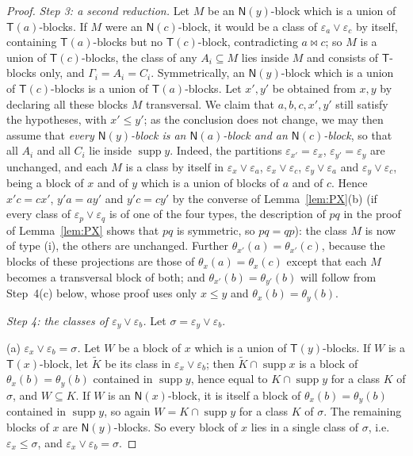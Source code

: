 \documentclass[11pt]{amsart}
\theoremstyle{definition}
\newcommand{\supp}{\operatorname{supp}}
\newcommand{\T}{\mathsf{T}}
\newcommand{\N}{\mathsf{N}}
\newcommand{\mt}{\bowtie}      %
\begin{document}
\begin{proof}
\emph{Step 3: a second reduction.} Let $M$ be an $\N(y)$-block which is a union of $\T(a)$-blocks. If $M$ were an $\N(c)$-block, it would be a class of $\varepsilon_a\vee\varepsilon_c$ by itself, containing $\T(a)$-blocks but no $\T(c)$-block, contradicting $a\mt c$; so $M$ is a union of $\T(c)$-blocks, the class of any $A_i\subseteq M$ lies inside $M$ and consists of $\T$-blocks only, and $\Gamma_i=A_i=C_i$. Symmetrically, an $\N(y)$-block which is a union of $\T(c)$-blocks is a union of $\T(a)$-blocks. Let $x',y'$ be obtained from $x,y$ by declaring all these blocks $M$ transversal. We claim that $a,b,c,x',y'$ still satisfy the hypotheses, with $x'\le y'$; as the conclusion does not change, we may then assume that \emph{every $\N(y)$-block is an $\N(a)$-block and an $\N(c)$-block}, so that all $A_i$ and all $C_i$ lie inside $\supp y$. Indeed, the partitions $\varepsilon_{x'}=\varepsilon_x$, $\varepsilon_{y'}=\varepsilon_y$ are unchanged, and each $M$ is a class by itself in $\varepsilon_x\vee\varepsilon_a$, $\varepsilon_x\vee\varepsilon_c$, $\varepsilon_y\vee\varepsilon_a$ and $\varepsilon_y\vee\varepsilon_c$, being a block of $x$ and of $y$ which is a union of blocks of $a$ and of $c$. Hence $x'c=cx'$, $y'a=ay'$ and $y'c=cy'$ by the converse of Lemma~\ref{lem:PX}(b) (if every class of $\varepsilon_p\vee\varepsilon_q$ is of one of the four types, the description of $pq$ in the proof of Lemma~\ref{lem:PX} shows that $pq$ is symmetric, so $pq=qp$): the class $M$ is now of type (i), the others are unchanged. Further $\theta_{x'}(a)=\theta_{x'}(c)$, because the blocks of these projections are those of $\theta_x(a)=\theta_x(c)$ except that each $M$ becomes a transversal block of both; and $\theta_{x'}(b)=\theta_{y'}(b)$ will follow from Step~4(c) below, whose proof uses only $x\le y$ and $\theta_x(b)=\theta_y(b)$.

\emph{Step 4: the classes of $\varepsilon_y\vee\varepsilon_b$.} Let $\sigma=\varepsilon_y\vee\varepsilon_b$.

(a) \emph{$\varepsilon_x\vee\varepsilon_b=\sigma$.} Let $W$ be a block of $x$ which is a union of $\T(y)$-blocks. If $W$ is a $\T(x)$-block, let $\tilde K$ be its class in $\varepsilon_x\vee\varepsilon_b$; then $\tilde K\cap\supp x$ is a block of $\theta_x(b)=\theta_y(b)$ contained in $\supp y$, hence equal to $K\cap\supp y$ for a class $K$ of $\sigma$, and $W\subseteq K$. If $W$ is an $\N(x)$-block, it is itself a block of $\theta_x(b)=\theta_y(b)$ contained in $\supp y$, so again $W=K\cap\supp y$ for a class $K$ of $\sigma$. The remaining blocks of $x$ are $\N(y)$-blocks. So every block of $x$ lies in a single class of $\sigma$, i.e.\ $\varepsilon_x\le\sigma$, and $\varepsilon_x\vee\varepsilon_b=\sigma$.


\end{proof}
\end{document}
